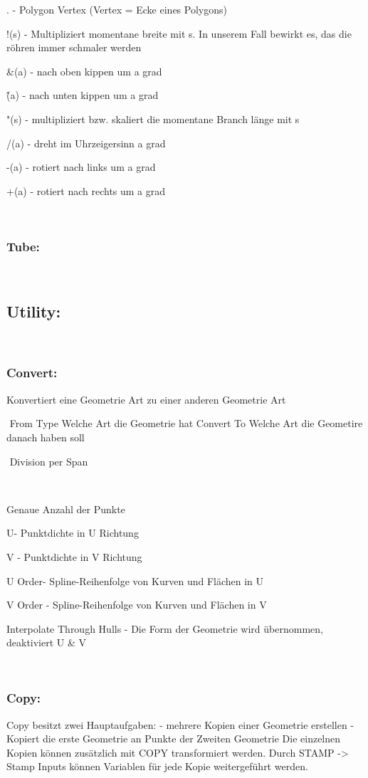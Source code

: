 \begin{​itemize}
\begin{​itemize}
\item .  - Polygon Vertex (Vertex = Ecke eines Polygons)
\item !(s) - Multipliziert momentane breite mit s. In unserem Fall bewirkt es, das die röhren immer schmaler werden
\item \&(a) - nach oben kippen um a grad
\item \^(a) - nach unten kippen um a grad
\item "(s) - multipliziert bzw. skaliert die momentane Branch länge mit s
\item /(a) - dreht im Uhrzeigersinn a grad
\item -(a) - rotiert nach links um a grad
\item +(a) - rotiert nach rechts um a grad
\end{​itemize}​

\subsubsection*{​Tube:}​
\subsection*{​Utility:}​
\subsubsection*{​Convert:}
Konvertiert eine Geometrie Art zu einer anderen Geometrie Art
	\begin{​itemize}​
	From Type	Welche Art die Geometrie hat
	Convert To	Welche Art die Geometire danach haben soll
	\end{​itemize}​
Division per Span
	\begin{​itemize}​
	\item Genaue Anzahl der Punkte
	\item U- Punktdichte in U Richtung
	\item V - Punktdichte in V Richtung
	\item U Order- Spline-Reihenfolge von Kurven und Flächen in U
	\item V Order - Spline-Reihenfolge von Kurven und Flächen in V
	\item Interpolate Through Hulls - Die Form der Geometrie wird übernommen, deaktiviert U & V
	\end{​itemize}​

\subsubsection*{​Copy:}
Copy besitzt zwei Hauptaufgaben:
- mehrere Kopien einer Geometrie erstellen
- Kopiert die erste Geometrie an Punkte der Zweiten Geometrie
Die einzelnen Kopien können zusätzlich mit COPY transformiert werden. 
Durch STAMP -> Stamp Inputs können Variablen für jede Kopie weitergeführt werden. 


\end{​itemize}
